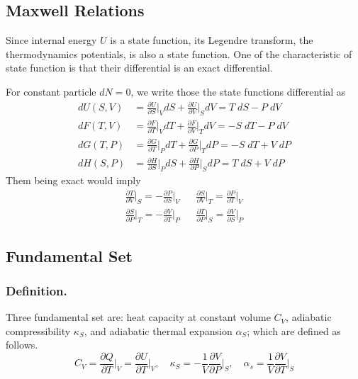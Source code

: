 \documentclass[../../../Main.tex]{subfiles}
\begin{document}
\subsection*{Maxwell Relations}
Since internal energy $U$ is a state function, its Legendre transform, the thermodynamics potentials, is also a state function. One of the characteristic of state function is that their differential is an exact differential. 

For constant particle $dN=0$, we write those the state functions differential as 
\begin{align*}
    dU(S,V)&=\frac{\partial U}{\partial S}\bigg|_V dS+\frac{\partial U}{\partial V}\bigg|_S dV= T\;dS-P\;dV\\
    dF(T, V ) &=\frac{\partial F}{\partial T}\bigg|_V dT+\frac{\partial F}{\partial V}\bigg|_T dV=  -S\;dT - P\;dV\\
    dG(T, P)&=\frac{\partial G}{\partial T}\bigg|_P dT+\frac{\partial G}{\partial P}\bigg|_T dP= -S\;dT + V\; d P\\
    dH (S, P) &=\frac{\partial H}{\partial S}\bigg|_P dS+\frac{\partial H}{\partial P}\bigg|_S dP=  T\; dS + V \;d P
\end{align*}
Them being exact would imply
\begin{align*}
    \frac{\partial T}{\partial V}\bigg|_S=-\frac{\partial P}{\partial S}\bigg|_V
    &&
    \frac{\partial S}{\partial V}\bigg|_T=\frac{\partial P}{\partial T}\bigg|_V \\
    \frac{\partial S}{\partial P}\bigg|_T  =-\frac{\partial V}{\partial T}\bigg|_P  
    &&
    \frac{\partial T}{\partial P}\bigg|_S =\frac{\partial V}{\partial S}\bigg|_P
\end{align*}

\subsection*{Fundamental Set}
\subsubsection*{Definition.} Three fundamental set are: heat capacity at constant volume $C_V$, adiabatic compressibility $\kappa_S$, and adiabatic thermal expansion $\alpha_S$; which are defined as follows.
\begin{equation*}
    C_V=\frac{\partial Q}{\partial T}\bigg|_V=\frac{\partial U}{\partial T}\bigg|_V,\quad 
    \kappa_S=-\frac{1}{V}\frac{\partial V}{\partial P}\bigg|_S,\quad
    \alpha_s=\frac{1}{V}\frac{\partial V}{\partial T}\bigg|_S
\end{equation*}
\end{document}
